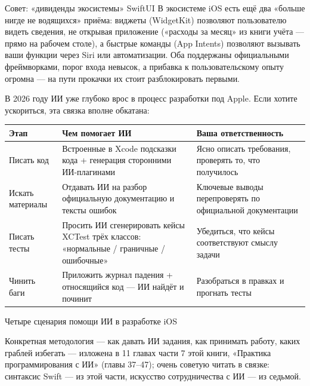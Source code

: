 \begin{tcbinfo}{Совет: «дивиденды экосистемы» SwiftUI}
В экосистеме iOS есть ещё два «больше нигде не водящихся» приёма: виджеты (WidgetKit) позволяют пользователю видеть сведения, не открывая приложение («расходы за месяц» из книги учёта — прямо на рабочем столе), а быстрые команды (App Intents) позволяют вызывать ваши функции через Siri или автоматизации. Оба поддержаны официальными фреймворками, порог входа невысок, а прибавка к пользовательскому опыту огромна — на пути прокачки их стоит разблокировать первыми.

\end{tcbinfo}


В 2026 году ИИ уже глубоко врос в процесс разработки под Apple. Если хотите ускориться, эта связка вполне обкатана:

\begin{center}
\begin{tabularx}{\linewidth}{|X|X|X|}
\hline
\textbf{Этап} & \textbf{Чем помогает ИИ} & \textbf{Ваша ответственность} \tabularnewline
\hline
Писать код & Встроенные в Xcode подсказки кода + генерация сторонними ИИ-плагинами & Ясно описать требования, проверять то, что получилось \tabularnewline
Искать материалы & Отдавать ИИ на разбор официальную документацию и тексты ошибок & Ключевые выводы перепроверять по официальной документации \tabularnewline
Писать тесты & Просить ИИ сгенерировать кейсы XCTest трёх классов: «нормальные / граничные / ошибочные» & Убедиться, что кейсы соответствуют смыслу задачи \tabularnewline
Чинить баги & Приложить журнал падения + относящийся код — ИИ найдёт и починит & Разобраться в правках и прогнать тесты \tabularnewline
\hline
\end{tabularx}
\end{center}

\begin{center}\small\color{gray}Четыре сценария помощи ИИ в разработке iOS\end{center}

Конкретная методология — как давать ИИ задания, как принимать работу, каких граблей избегать — изложена в 11 главах части 7 этой книги, «Практика программирования с ИИ» (главы 37–47); очень советую читать в связке: синтаксис Swift — из этой части, искусство сотрудничества с ИИ — из седьмой.

